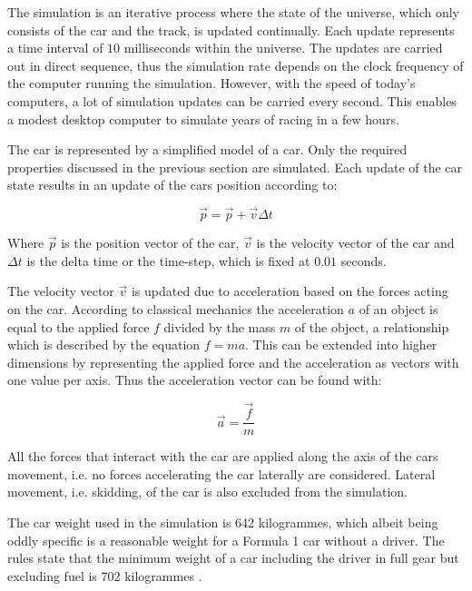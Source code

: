 The simulation is an iterative process where the state of the universe, which only consists of the car and the track, is updated continually. Each update represents a time interval of $10$ milliseconds within the universe. The updates are carried out in direct sequence, thus the simulation rate depends on the clock frequency of the computer running the simulation. However, with the speed of today's computers, a lot of simulation updates can be carried every second. This enables a modest desktop computer to simulate years of racing in a few hours. 

The car is represented by a simplified model of a car. Only the required properties discussed in the previous section are simulated. Each update of the car state results in an update of the cars position according to:

\begin{equation}
    \vec{p} = \vec{p} + \vec{v}\Delta t 
\end{equation}

Where $\vec{p}$ is the position vector of the car, $\vec{v}$ is the velocity vector of the car and $\Delta t$ is the delta time or the time-step, which is fixed at $0.01$ seconds.

The velocity vector $\vec{v}$ is updated due to acceleration based on the forces acting on the car. According to classical mechanics the acceleration $a$ of an object is equal to the applied force $f$ divided by the mass $m$ of the object, a relationship which is described by the equation $f = ma$. This can be extended into higher dimensions by representing the applied force and the acceleration as vectors with one value per axis. Thus the acceleration vector can be found with:

\begin{equation}
    \vec{a} = \frac{\vec{f}}{m}  
\end{equation}

All the forces that interact with the car are applied along the axis of the cars movement, i.e. no forces accelerating the car laterally are considered. Lateral movement, i.e. skidding, of the car is also excluded from the simulation. 


The car weight used in the simulation is 642 kilogrammes, which albeit being oddly specific is a reasonable weight for a Formula 1 car without a driver. The rules state that the minimum weight of a car including the driver in full gear but excluding fuel is 702 kilogrammes \cite{f1_weight}.

